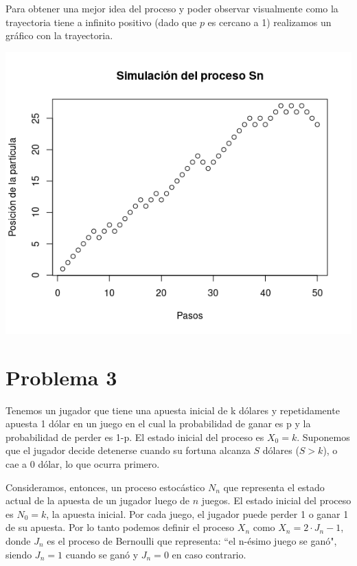 \documentclass[11pt]{article}
\begin{document}
\vspace{-0.65cm}

Para obtener una mejor idea del proceso y poder observar visualmente como la trayectoria tiene a infinito positivo (dado que $p$ es cercano a 1) realizamos un gráfico con la trayectoria.

\begin{center}\includegraphics[scale = 0.6]{P2Simulacion.png}\end{center}


\section*{Problema 3}

Tenemos un jugador que tiene una apuesta inicial de k dólares y repetidamente apuesta 1 dólar en un juego
en el cual la probabilidad de ganar es p y la probabilidad de perder es 1-p. El estado inicial del proceso es $X_0= k$. 
Suponemos que el jugador decide detenerse cuando su fortuna alcanza $S$ dólares ($S > k$), o cae a $0$ dólar, lo que ocurra primero.

Consideramos, entonces, un proceso estocástico $N_n$ que representa el estado actual de la
apuesta de un jugador luego de $n$ juegos. El estado inicial del proceso es
$N_0 = k$, la apuesta inicial. Por cada juego, el jugador puede perder 1 o
ganar 1 de su apuesta. Por lo tanto podemos definir el proceso $X_n$ como
$X_n = 2 \cdot J_n - 1$, donde $J_n$ es el proceso de Bernoulli que representa: “el
n-ésimo juego se ganó", siendo $J_n=1$ cuando se ganó y $J_n=0$ en caso contrario.
\end{document}
